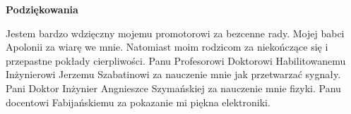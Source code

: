 \newpage
    \begin{center}
	{\large\bfseries Podziękowania}\par\bigskip\end{center}
Jestem bardzo wdzięczny	mojemu promotorowi za bezcenne rady.
Mojej babci Apolonii za wiarę we mnie.
Natomiast moim rodzicom za niekończące się i przepastne pokłady cierpliwości.
Panu Profesorowi Doktorowi Habilitowanemu Inżynierowi Jerzemu Szabatinowi za nauczenie mnie jak przetwarzać sygnały.
Pani Doktor Inżynier Angnieszce Szymańskiej za nauczenie mnie fizyki.
Panu docentowi Fabijańskiemu za pokazanie mi piękna elektroniki.

